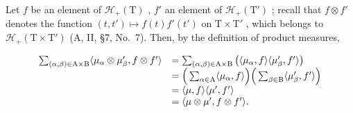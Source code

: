 Let \(f\) be an element of \(\mathcal{H}_{+}(\mathrm{T})\) , \(f'\) an element of \(\mathcal{H}_{+}(\mathrm{T}')\) ; recall that \(f \otimes f'\) denotes the function \((t, t') \mapsto f(t)f'(t')\) on \(\mathrm{T} \times \mathrm{T}'\) , which belongs to \(\mathcal{H}_{+}(\mathrm{T} \times \mathrm{T}')\) (A, II, §7, No.~7). Then, by the definition of product measures,

\[
\begin{array}{r l} \sum_ {(\alpha , \beta) \in \mathrm{A} \times \mathrm{B}} \langle \mu_ {\alpha} \otimes \mu_ {\beta} ^ {\prime}, f \otimes f ^ {\prime} \rangle & = \sum_ {(\alpha , \beta) \in \mathrm{A} \times \mathrm{B}} \big (\langle \mu_ {\alpha}, f \rangle \langle \mu_ {\beta} ^ {\prime}, f ^ {\prime} \rangle \big) \\ & = \Big (\sum_ {\alpha \in \mathrm{A}} \langle \mu_ {\alpha}, f \rangle \Big) \Big (\sum_ {\beta \in \mathrm{B}} \langle \mu_ {\beta} ^ {\prime}, f ^ {\prime} \rangle \Big) \\ & = \langle \mu , f \rangle \langle \mu^ {\prime}, f ^ {\prime} \rangle \\ & = \langle \mu \otimes \mu^ {\prime}, f \otimes f ^ {\prime} \rangle . \end{array}
\]

